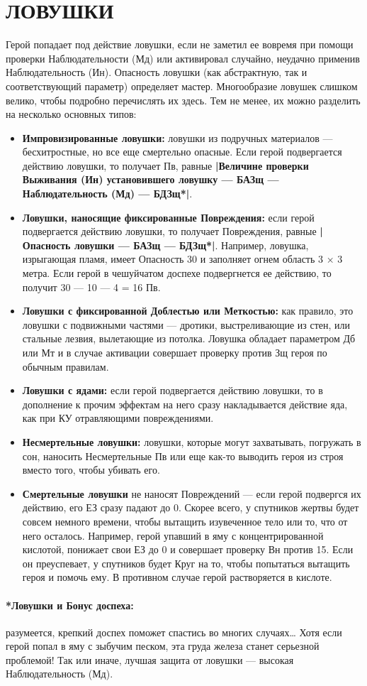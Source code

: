 \section{ЛОВУШКИ}
Герой попадает под действие ловушки, если не заметил ее вовремя при помощи проверки Наблюдательности (Мд) или активировал случайно, неудачно применив Наблюдательность (Ин). Опасность ловушки (как абстрактную, так и соответствующий параметр) определяет мастер. Многообразие ловушек слишком велико, чтобы подробно перечислять их здесь. Тем не менее, их можно разделить на несколько основных типов:
\begin{itemize}
\item \textbf{Импровизированные ловушки:} ловушки из подручных материалов — бесхитростные, но все еще смертельно опасные. Если герой подвергается действию ловушки, то получает Пв, равные \textbf{|Величине проверки Выживания (Ин) установившего ловушку — БАЗщ — Наблюдательность (Мд) — БДЗщ*|}.
\item \textbf{Ловушки, наносящие фиксированные Повреждения:} если герой подвергается действию ловушки, то получает Повреждения, равные \textbf{|Опасность ловушки — БАЗщ — БДЗщ*|}. Например, ловушка, изрыгающая пламя, имеет Опасность 30 и заполняет огнем область 3 × 3 метра. Если герой в чешуйчатом доспехе подвергнется ее действию, то получит 30 — 10 — 4 = 16 Пв.
\item \textbf{Ловушки с фиксированной Доблестью или Меткостью:} как правило, это ловушки с подвижными частями — дротики, выстреливающие из стен, или стальные лезвия, вылетающие из потолка. Ловушка обладает параметром Дб или Мт и в случае активации совершает проверку против Зщ героя по обычным правилам.
\item \textbf{Ловушки с ядами:} если герой подвергается действию ловушки, то в дополнение к прочим эффектам на него сразу накладывается действие яда, как при КУ отравляющими повреждениями.
\item \textbf{Несмертельные ловушки:} ловушки, которые могут захватывать, погружать в сон, наносить Несмертельные Пв или еще как-то выводить героя из строя вместо того, чтобы убивать его.
\item \textbf{Смертельные ловушки} не наносят Повреждений — если герой подвергся их действию, его ЕЗ сразу падают до 0. Скорее всего, у спутников жертвы будет совсем немного времени, чтобы вытащить изувеченное тело или то, что от него осталось. Например, герой упавший в яму с концентрированной кислотой, понижает свои ЕЗ до 0 и совершает проверку Вн против 15. Если он преуспевает, у спутников будет Круг на то, чтобы попытаться вытащить героя и помочь ему. В противном случае герой растворяется в кислоте.
\end{itemize}
\paragraph{*Ловушки и Бонус доспеха:} разумеется, крепкий доспех поможет спастись во многих случаях… Хотя если герой попал в яму с зыбучим песком, эта груда железа станет серьезной проблемой! Так или иначе, лучшая защита от ловушки — высокая Наблюдательность (Мд).